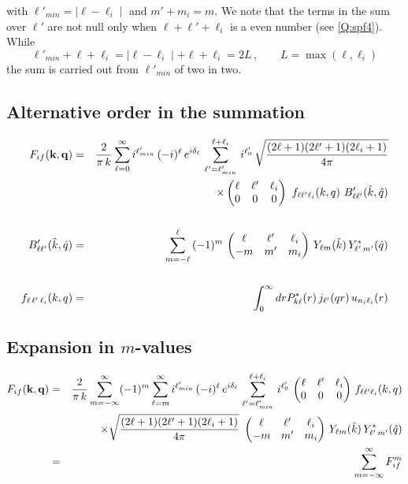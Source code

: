 with $\ell'_{min} = \mid \ell - \ell_{i}\mid $ and $m' + m_{i} = m$.
We note that the terms in the sum over $\ell'$ are not null only when
$\ell + \ell' + \ell_{i}$ is a even number (see \ref{Q:spf4}). While
\[
\ell'_{min} + \ell + \ell_{i}= \mid \ell - \ell_{i}\mid  + \ell +
\ell_{i} = 2 L \, , \qquad L = \max(\ell,\ell_{i})
\]
the sum is carried out from $\ell'_{min}$ of two in two.

\subsection*{Alternative order in the summation}
%
\begin{eqnarray}\label{Q:ap6b}
F_{if}(\mathbf{k},\mathbf{q})&=& \frac{2}{\pi \, k} \sum_{\ell=0}^{\infty}
i^{\ell'_{min}} \, (-i)^{\ell} \, e^{i \delta_{\ell}} \,
\sum_{\ell'=\ell'_{min}}^{\ell + \ell_{i}} \, i^{\ell'_{0}} \,
\sqrt{\frac{(2 \ell + 1)(2 \ell' + 1)(2 \ell_{i} + 1)}{4 \pi }}
\nonumber
\\
&& {\times} \left( \begin{matrix}\ell & \ell' & \ell_{i} \cr 0 & 0 & 0
  \end{matrix}
\right) \
f_{\ell \ell' \ell_{i}}(k,q) \ B'_{\ell \ell'}(\hat{k}, \hat{q})
\\
\nonumber
\\
B'_{\ell \ell'}(\hat{k},\hat{q}) &=& \sum_{m=-\ell}^{\ell} \, (-1)^{m}
\,\left( \begin{matrix}\ell & \ell' & \ell_{i} \cr -m & m' & m_{i}
  \end{matrix}
\right)
\, Y_{\ell m}(\hat{k})\, Y^{*}_{\ell'\,m'}(\hat{q})
\\
\nonumber \\
f_{\ell \, \ell' \, \ell_{i}}(k,q) &=& \int_{0}^{\infty} d r
P^{*}_{k \ell}(r) \, j_{\ell'}(q r) \, u_{n_{i}\ell_{i}}(r)
\end{eqnarray}

\subsection*{Expansion in $m$-values}
%
\begin{eqnarray}\label{Q:ap6c}
F_{if}(\mathbf{k},\mathbf{q})&=& \frac{2}{\pi \, k} \sum_{m=-\infty}^{\infty}
(-1)^{m} \sum_{\ell=m}^{\infty} i^{\ell'_{min}} \, (-i)^{\ell} \,
e^{i \delta_{\ell}} \, \sum_{\ell'=\ell'_{min}}^{\ell + \ell_{i}}
\, i^{\ell'_{0}} \, \left( \begin{matrix}\ell & \ell' & \ell_{i} \cr 0 & 0
& 0
\end{matrix}
\right)\, f_{\ell \ell' \ell_{i}}(k,q)  \nonumber
\\
&& {\times}  \sqrt{\frac{(2 \ell + 1)(2 \ell' + 1)(2 \ell_{i} + 1)}{4 \pi }} \
\left( \begin{matrix}\ell & \ell' & \ell_{i} \cr -m & m' & m_{i}
  \end{matrix}
\right) \,
Y_{\ell m}(\hat{k})\, Y^{*}_{\ell'\,m'}(\hat{q}) \nonumber \\
&=& \sum_{m=-\infty}^{\infty} F_{if}^{m}
\end{eqnarray}



